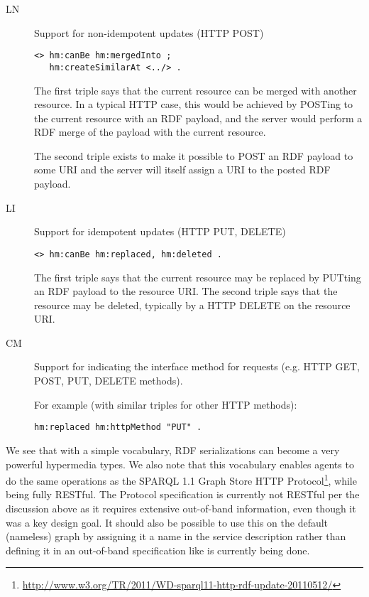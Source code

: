 \documentclass{llncs}
\begin{document}
\begin{description}

\item[\textsf{LN}] Support for non-idempotent updates (HTTP POST) 

\begin{verbatim}
<> hm:canBe hm:mergedInto ;
   hm:createSimilarAt <../> .
\end{verbatim}

The first triple says that the current resource can be merged with
another resource. In a typical HTTP case, this would be achieved by
POSTing to the current resource with an RDF payload, and the server
would perform a RDF merge of the payload with the current resource.

The second triple exists to make it possible to POST an RDF payload to
some URI and the server will itself assign a URI to the posted RDF
payload.

\item[\textsf{LI}] Support for idempotent updates (HTTP PUT, DELETE) 

\begin{verbatim}
<> hm:canBe hm:replaced, hm:deleted .
\end{verbatim}


The first triple says that the current resource may be replaced by
PUTting an RDF payload to the resource URI. The second triple says
that the resource may be deleted, typically by a HTTP DELETE on the
resource URI.


\item[\textsf{CM}] Support for indicating the interface method for requests
  (e.g. HTTP GET, POST, PUT, DELETE methods).

For example (with similar triples for other HTTP methods):
\begin{verbatim}
hm:replaced hm:httpMethod "PUT" .
\end{verbatim}

\end{description}

We see that with a simple vocabulary, RDF serializations can become a
very powerful hypermedia types. We also note that this vocabulary
enables agents to do the same operations as the SPARQL 1.1 Graph Store
HTTP
Protocol\footnote{\url{http://www.w3.org/TR/2011/WD-sparql11-http-rdf-update-20110512/}},
while being fully RESTful. The Protocol specification is currently not
RESTful per the discussion above as it requires extensive out-of-band
information, even though it was a key design goal. It should also be
possible to use this on the default (nameless) graph by assigning it a
name in the service description rather than defining it in an
out-of-band specification like is currently being done.
\end{document}
